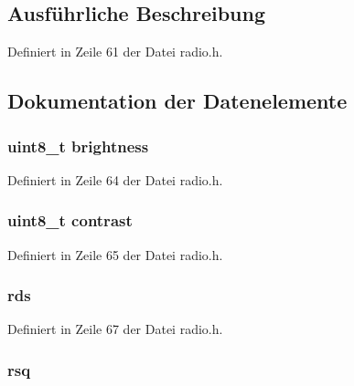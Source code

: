\subsection{Ausführliche Beschreibung}


Definiert in Zeile 61 der Datei radio.\+h.



\subsection{Dokumentation der Datenelemente}
\hypertarget{structradio_a837c871f200f8c3d19d0c7f2e031ffc4}{}
\subsubsection[{brightness}]{\setlength{\rightskip}{0pt plus 5cm}uint8\+\_\+t brightness}\label{structradio_a837c871f200f8c3d19d0c7f2e031ffc4}


Definiert in Zeile 64 der Datei radio.\+h.

\hypertarget{structradio_a1498c49a1583af22b892d695900a74db}{}
\subsubsection[{contrast}]{\setlength{\rightskip}{0pt plus 5cm}uint8\+\_\+t contrast}\label{structradio_a1498c49a1583af22b892d695900a74db}


Definiert in Zeile 65 der Datei radio.\+h.

\hypertarget{structradio_a44efb20f93a5de661983c36b4a870f4e}{}
\subsubsection[{rds}]{ {\bf rds}}\label{structradio_a44efb20f93a5de661983c36b4a870f4e}


Definiert in Zeile 67 der Datei radio.\+h.

\hypertarget{structradio_aba45ded08c975dcc6ee7d58687e8534e}{}
\subsubsection[{rsq}]{ rsq}\label{structradio_aba45ded08c975dcc6ee7d58687e8534e}


